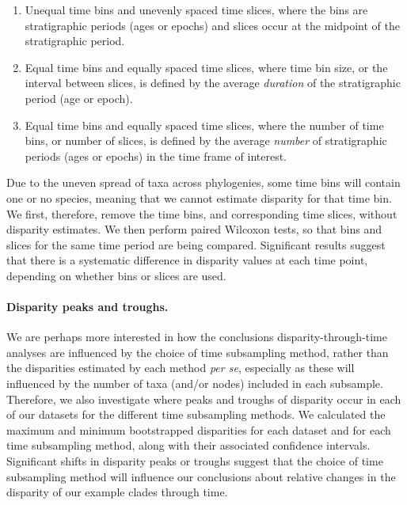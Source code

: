 \documentclass[12pt,a4paper]{article}
\begin{document}
\begin{enumerate}
  \item Unequal time bins and unevenly spaced time slices, where the bins are stratigraphic periods (ages or epochs) and slices occur at the midpoint of the stratigraphic period.
  \item Equal time bins and equally spaced time slices, where time bin size, or the interval between slices, is defined by the average \textit{duration} of the stratigraphic period (age or epoch).
  \item Equal time bins and equally spaced time slices, where the number of time bins, or number of slices, is defined by the average \textit{number} of stratigraphic periods (ages or epochs) in the time frame of interest.
\end{enumerate}

Due to the uneven spread of taxa across phylogenies, some time bins will contain one or no species, meaning that we cannot estimate disparity for that time bin. 
We first, therefore, remove the time bins, and corresponding time slices, without disparity estimates. 
We then perform paired Wilcoxon tests, so that bins and slices for the same time period are being compared. 
Significant results suggest that there is a systematic difference in disparity values at each time point, depending on whether bins or slices are used.

\paragraph{Disparity peaks and troughs.}
We are perhaps more interested in how the conclusions disparity-through-time analyses are influenced by the choice of time subsampling method, rather than the disparities estimated by each method \textit{per se}, especially as these will influenced by the number of taxa (and/or nodes) included in each subsample. 
Therefore, we also investigate where peaks and troughs of disparity occur in each of our datasets for the different time subsampling methods. 
We calculated the maximum and minimum bootstrapped disparities for each dataset and for each time subsampling method, along with their associated confidence intervals.
Significant shifts in disparity peaks or troughs suggest that the choice of time subsampling method will influence our conclusions about relative changes in the disparity of our example clades through time. 
\end{document}

